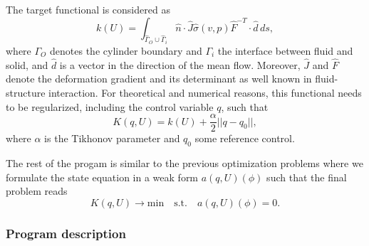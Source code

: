 The target functional is considered as 
\[
k(U) = \int_{\hat\Gamma_O \cup \hat\Gamma_i} \hat n\cdot \hat J\hat\sigma(v,p)\hat
F^{-T} \cdot \hat d \, ds,
\]
where $\Gamma_O$ denotes the cylinder boundary and $\Gamma_i$ the 
interface between fluid and solid, and $\hat d$ is a vector in the
direction
of the mean flow. Moreover, $\hat J$ and $\hat F$ denote the deformation 
gradient and its determinant as well known in fluid-structure interaction.
For theoretical and numerical reasons, this functional 
needs to be regularized, including the control variable $q$, such that
\[
K(q,U) = k(U) + \frac{\alpha}{2}||q - q_0||,
\] 
where $\alpha$ is the Tikhonov parameter and $q_0$ some 
reference control. 

The rest of the progam is similar to the previous optimization problems where
we formulate the state equation in a weak form $a(q,U)(\phi)$ such that the 
final problem reads
\[
K(q,U) \rightarrow \text{min} \quad \text{s.t.} \quad a(q,U)(\phi) = 0.
\]

\subsubsection{Program description}





